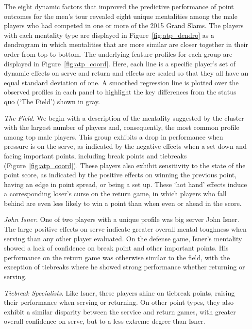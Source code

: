 \documentclass{Latex/svjour3}
\begin{document}
The eight dynamic factors that improved the predictive performance of point
outcomes for the men's tour revealed eight unique mentalities among the male
players who had competed in one or more of the 2015 Grand Slams. The players
with each mentality type are displayed in Figure~\ref{fig:atp_dendro} as a
dendrogram in which mentalities that are more similar are closer together in
their order from top to bottom. The underlying feature profiles for each group
are displayed in Figure~\ref{fig:atp_coord}. Here, each line is a specific
player's set of dynamic effects on serve and return and effects are scaled so
that they all have an equal standard deviation of one. A smoothed regression
line is plotted over the observed profiles in each panel to highlight the key
differences from the status quo (`The Field') shown in gray.

\textit{The Field}. We begin with a description of the mentality suggested by
the cluster with the largest number of players and, consequently, the most
common profile among top male players. This group exhibits a drop in performance
when pressure is on the serve, as indicated by the negative effects when a set
down and facing important points, including break points and tiebreaks
(Figure~\ref{fig:atp_coord}). These players also exhibit sensitivity to the
state of the point score, as indicated by the positive effects on winning the
previous point, having an edge in point spread, or being a set up. These `hot
hand' effects induce a corresponding loser's curse on the return game, in which
players who fall behind are even less likely to win a point than when even or
ahead in the score.

\textit{John Isner}. One of two players with a unique profile was big server
John Isner. The large positive effects on serve indicate greater overall mental
toughness when serving than any other player evaluated. On the defense game,
Isner's mentality showed  a lack of confidence on break point and other
important points. His performance on the return game was otherwise similar to
the field, with the exception of tiebreaks where he showed strong performance
whether returning or serving.

\textit{Tiebreak Specialists}. Like Isner, these players shine on tiebreak
points, raising their performance when serving or returning. On other point
types, they also exhibit a similar disparity between the service and return
games, with greater overall confidence on serve, but to a less extreme degree
than Isner.
\end{document}
